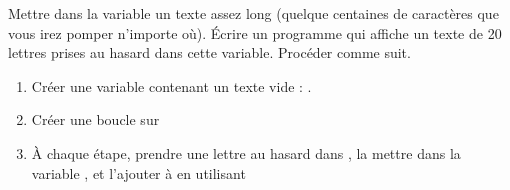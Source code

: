 
\begin{exercice}\label{exoPremiere-0053}

    Mettre dans la variable  un texte assez long (quelque centaines de caractères que vous irez pomper n'importe où). Écrire un programme qui affiche un texte de 20 lettres prises au hasard dans cette variable. Procéder comme suit.
    \begin{enumerate}
        \item
            Créer une variable contenant un texte vide : .
        \item
            Créer une boucle  sur 
        \item
            À chaque étape, prendre une lettre au hasard dans , la mettre dans la variable , et l'ajouter à  en utilisant
            \begin{quote}
            \end{quote}
    \end{enumerate}

\end{exercice}

